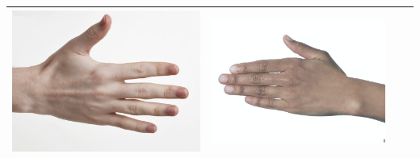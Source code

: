 \begin{longtable}{|c||c|c|c|}
\begin{minipage}{.29\textwidth}
    \includegraphics[width=\textwidth,height=\textheight,keepaspectratio]{../inputs/hand_pale.jpg}
  \end{minipage} & 
  \begin{minipage}{.29\textwidth}
    \includegraphics[width=\textwidth,height=\textheight,keepaspectratio]{../rc_test/outputs/20170516_boost_test/hand_brown_to_hand_pale.jpg}
  \end{minipage} \\
    \hline
\end{longtable}

